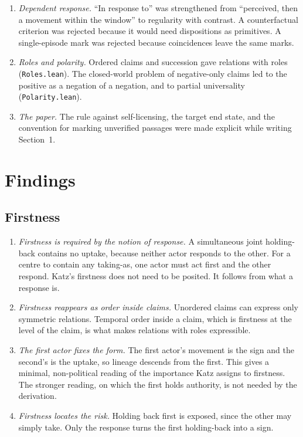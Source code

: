 \documentclass[11pt]{article}
\begin{document}
\begin{enumerate}
  \item \emph{Dependent response.} ``In response to'' was strengthened from ``perceived,
    then a movement within the window'' to regularity with contrast. A counterfactual
    criterion was rejected because it would need dispositions as primitives. A
    single-episode mark was rejected because coincidences leave the same marks.
  \item \emph{Roles and polarity.} Ordered claims and succession gave relations with roles
    (\texttt{Roles.lean}). The closed-world problem of negative-only claims led to the
    positive as a negation of a negation, and to partial universality
    (\texttt{Polarity.lean}).
  \item \emph{The paper.} The rule against self-licensing, the target end state, and the
    convention for marking unverified passages were made explicit while writing Section~1.
\end{enumerate}

\section{Findings}

\subsection{Firstness}
\begin{enumerate}
  \item \emph{Firstness is required by the notion of response.} A simultaneous joint
    holding-back contains no uptake, because neither actor responds to the other. For a
    centre to contain any taking-as, one actor must act first and the other respond.
    Katz's firstness does not need to be posited. It follows from what a response is.
  \item \emph{Firstness reappears as order inside claims.} Unordered claims can express
    only symmetric relations. Temporal order inside a claim, which is firstness at the
    level of the claim, is what makes relations with roles expressible.
  \item \emph{The first actor fixes the form.} The first actor's movement is the sign and
    the second's is the uptake, so lineage descends from the first. This gives a minimal,
    non-political reading of the importance Katz assigns to firstness. The stronger reading,
    on which the first holds authority, is not needed by the derivation.
  \item \emph{Firstness locates the risk.} Holding back first is exposed, since the other
    may simply take. Only the response turns the first holding-back into a sign.
\end{enumerate}
\end{document}
